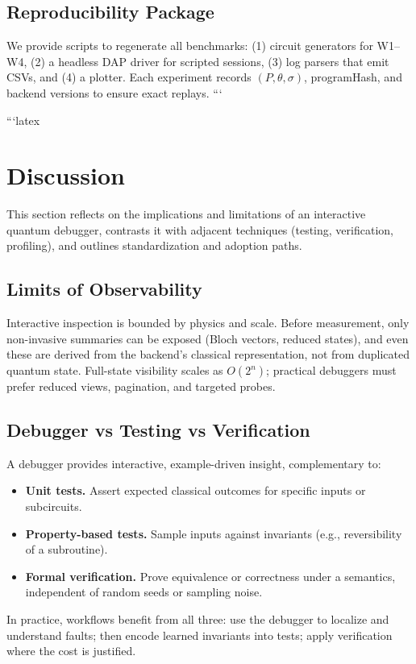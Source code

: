 \documentclass[12pt]{article}
\begin{document}
\begin{itemize}
\subsection{Reproducibility Package}

We provide scripts to regenerate all benchmarks: (1) circuit generators for W1--W4, (2) a headless DAP driver for scripted sessions, (3) log parsers that emit CSVs, and (4) a plotter. Each experiment records $(P,\theta,\sigma)$, programHash, and backend versions to ensure exact replays.
```

```latex
\section{Discussion}
\label{sec:discussion}

This section reflects on the implications and limitations of an interactive quantum debugger, contrasts it with adjacent techniques (testing, verification, profiling), and outlines standardization and adoption paths.

\subsection{Limits of Observability}

Interactive inspection is bounded by physics and scale. Before measurement, only non-invasive summaries can be exposed (Bloch vectors, reduced states), and even these are derived from the backend's classical representation, not from duplicated quantum state. Full-state visibility scales as $O(2^n)$; practical debuggers must prefer reduced views, pagination, and targeted probes.

\subsection{Debugger vs Testing vs Verification}

A debugger provides interactive, example-driven insight, complementary to:
\begin{itemize}
  \item \textbf{Unit tests.} Assert expected classical outcomes for specific inputs or subcircuits.
  \item \textbf{Property-based tests.} Sample inputs against invariants (e.g., reversibility of a subroutine).
  \item \textbf{Formal verification.} Prove equivalence or correctness under a semantics, independent of random seeds or sampling noise.
\end{itemize}
In practice, workflows benefit from all three: use the debugger to localize and understand faults; then encode learned invariants into tests; apply verification where the cost is justified.


\end{itemize}
\end{document}
